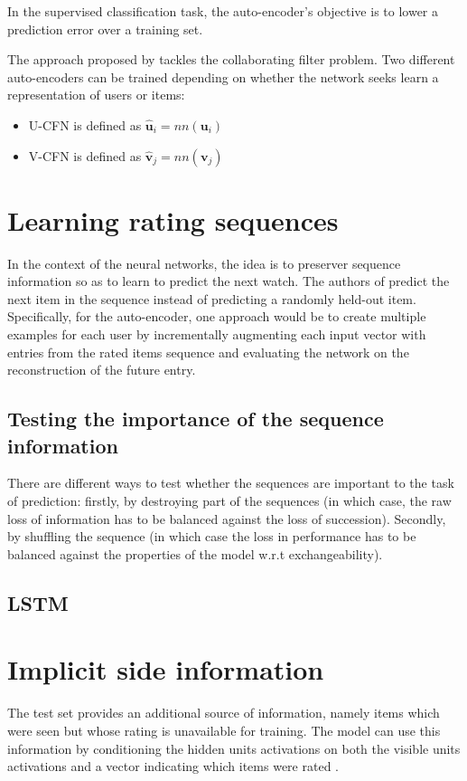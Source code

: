 \documentclass[10pt,twocolumn]{article}
\begin{document}
In the supervised classification task, the auto-encoder's objective is to lower a prediction error over a training set.

The approach proposed by \cite{strub2016hybrid} tackles the collaborating filter problem. Two different auto-encoders can be trained depending on whether the network seeks learn a representation of users or items:
\begin{itemize}
\item U-CFN is defined as $\hat{\textbf{u}}_i = nn(\textbf{u}_i)$
\item V-CFN is defined as $\hat{\textbf{v}}_j = nn(\textbf{v}_j)$ 
\end{itemize}

\section{Learning rating sequences}
 In the context of the neural networks, the idea is to preserver sequence information so as to learn to predict the next watch. The authors of \cite{youtube2016} predict the next item in the sequence instead of predicting a randomly held-out item. Specifically, for the auto-encoder, one approach would be to create multiple examples for each user by incrementally augmenting each input vector with entries from the rated items sequence and evaluating the network on the reconstruction of the future entry.
\subsection{Testing the importance of the sequence information}
There are different ways to test whether the sequences are important to the task of prediction: firstly, by destroying part of the sequences (in which case, the raw loss of information has to be balanced against the loss of succession). Secondly, by shuffling the sequence (in which case the loss in performance has to be balanced against the properties of the model w.r.t exchangeability).
\subsection{LSTM}


\section{Implicit side information}
The test set provides an additional source of information, namely items which were seen but whose rating is unavailable for training. The model can use this information by conditioning the hidden units activations on both the visible units activations and a vector indicating which items were rated \cite{salakhutdinov2007restricted}.
\end{document}
